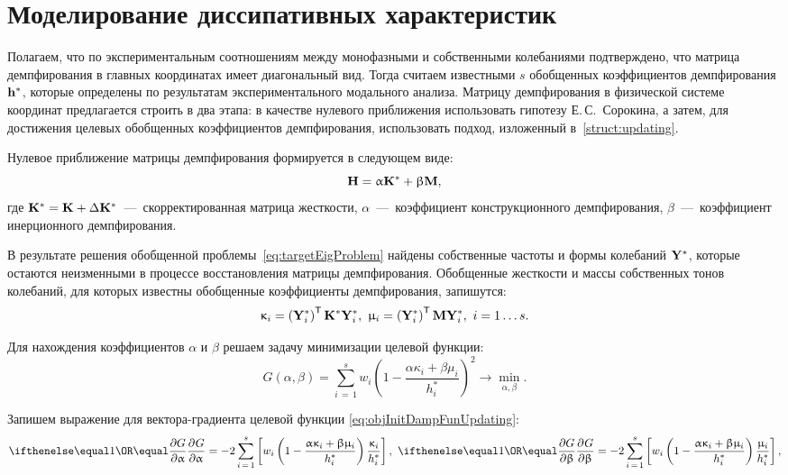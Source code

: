 \section{Моделирование диссипативных характеристик}

Полагаем, что по экспериментальным соотношениям между монофазными и собственными колебаниями подтверждено, что матрица демпфирования в главных координатах имеет диагональный вид. Тогда считаем известными $ s $ обобщенных коэффициентов демпфирования $ \mathbf{h} ^ \ast $, которые определены по результатам экспериментального модального анализа. Матрицу демпфирования в физической системе координат предлагается строить в два этапа: в качестве нулевого приближения использовать гипотезу Е.\,С.~Сорокина, а затем, для достижения целевых обобщенных коэффициентов демпфирования, использовать подход, изложенный в~\ref{struct:updating}.

Нулевое приближение матрицы демпфирования формируется в следующем виде:
\begin{equation}
	\mathbf{H} = \upalpha \mathbf{K} ^ \ast + \upbeta \mathbf{M},
\end{equation}
где $ \mathbf{K} ^ \ast = \mathbf{K} + \Delta \mathbf{K} ^ \ast $~---~скорректированная матрица жесткости, $ \alpha $~---~коэффициент конструкционного демпфирования, $ \beta $~---~коэффициент инерционного демпфирования.

В результате решения обобщенной проблемы~\eqref{eq:targetEigProblem} найдены собственные частоты и формы колебаний $ \mathbf{Y} ^ \ast $, которые остаются неизменными в процессе восстановления матрицы демпфирования. Обобщенные жесткости и массы собственных тонов колебаний, для которых известны обобщенные коэффициенты демпфирования, запишутся:
\begin{equation}
	\upkappa_i = \left( \mathbf{Y}_i ^ \ast \right) ^ \mathsf{T} \mathbf{K} ^ \ast \mathbf{Y}_i ^ \ast, \
	\upmu_i = \left( \mathbf{Y}_i ^ \ast \right) ^ \mathsf{T} \mathbf{M} \mathbf{Y}_i ^ \ast, \ i = 1 \hdots s. 
\end{equation}

Для нахождения коэффициентов $ \alpha $ и $ \beta $ решаем задачу минимизации целевой функции:
\begin{equation}
	G(\alpha, \beta) = \sum \limits_{i\,=\,1} ^ s w_i \left( 1 - \frac{\alpha \kappa_i + \beta \mu_i}{h_i ^ \ast} \right)^2 \rightarrow \min_{\alpha, \beta}.
	\label{eq:objInitDampFunUpdating}
\end{equation}

Запишем выражение для вектора-градиента целевой функции \eqref{eq:objInitDampFunUpdating}:
\begin{equation*}
	\partDer{G}{\alpha}{} = -2 \sum_{i\,=\,1} ^ s \sbrackets{w_i \rbrackets{1 - \frac{\alpha \kappa_i + \beta \mu_i}{h_i ^ \ast}} \frac{\kappa_i}{h_i ^ \ast}}, \
	 \partDer{G}{\beta}{} = -2 \sum_{i\,=\,1} ^ s \sbrackets{w_i \rbrackets{1 - \frac{\alpha \kappa_i + \beta \mu_i}{h_i ^ \ast}} \frac{\mu_i}{h_i ^ \ast}},
\end{equation*}

